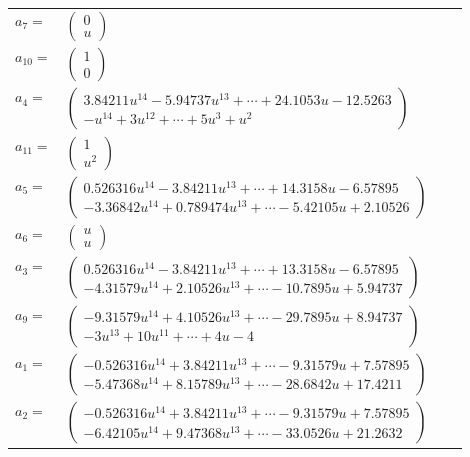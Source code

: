 \documentclass[1p]{elsarticle_modified}
\theoremstyle{definition}
\begin{document}
\begin{tabular}{m{7pt} m{180pt} m{7pt} m{180pt} }
\flushright $a_{7}=$&$\begin{pmatrix}0\\u\end{pmatrix}$ \\
\flushright $a_{10}=$&$\begin{pmatrix}1\\0\end{pmatrix}$ \\
\flushright $a_{4}=$&$\begin{pmatrix}3.84211 u^{14}-5.94737 u^{13}+\cdots+24.1053 u-12.5263\\- u^{14}+3 u^{12}+\cdots+5 u^3+u^2\end{pmatrix}$ \\
\flushright $a_{11}=$&$\begin{pmatrix}1\\u^2\end{pmatrix}$ \\
\flushright $a_{5}=$&$\begin{pmatrix}0.526316 u^{14}-3.84211 u^{13}+\cdots+14.3158 u-6.57895\\-3.36842 u^{14}+0.789474 u^{13}+\cdots-5.42105 u+2.10526\end{pmatrix}$ \\
\flushright $a_{6}=$&$\begin{pmatrix}u\\u\end{pmatrix}$ \\
\flushright $a_{3}=$&$\begin{pmatrix}0.526316 u^{14}-3.84211 u^{13}+\cdots+13.3158 u-6.57895\\-4.31579 u^{14}+2.10526 u^{13}+\cdots-10.7895 u+5.94737\end{pmatrix}$ \\
\flushright $a_{9}=$&$\begin{pmatrix}-9.31579 u^{14}+4.10526 u^{13}+\cdots-29.7895 u+8.94737\\-3 u^{13}+10 u^{11}+\cdots+4 u-4\end{pmatrix}$ \\
\flushright $a_{1}=$&$\begin{pmatrix}-0.526316 u^{14}+3.84211 u^{13}+\cdots-9.31579 u+7.57895\\-5.47368 u^{14}+8.15789 u^{13}+\cdots-28.6842 u+17.4211\end{pmatrix}$ \\
\flushright $a_{2}=$&$\begin{pmatrix}-0.526316 u^{14}+3.84211 u^{13}+\cdots-9.31579 u+7.57895\\-6.42105 u^{14}+9.47368 u^{13}+\cdots-33.0526 u+21.2632\end{pmatrix}$ \\

\end{tabular}
\end{document}
